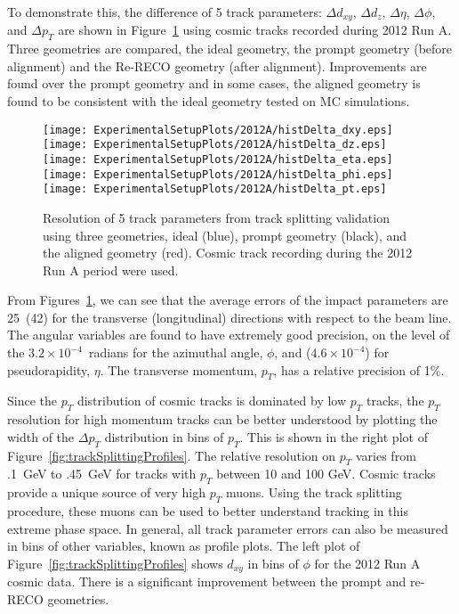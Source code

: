 To demonstrate this, the
difference of 5 track parameters: $\Delta d_{xy}$, $\Delta d_z$, 
$\Delta \eta$, $\Delta\phi$, and $\Delta p_T$ are shown in 
Figure~\ref{fig:trackSplitting2012A} 
using cosmic tracks recorded during 2012 Run A.  Three geometries 
are compared, the ideal geometry, the 
prompt geometry (before alignment) and the Re-RECO geometry (after 
alignment).  Improvements are found over the prompt geometry and
in some cases, the aligned geometry is found to be consistent 
with the ideal geometry tested on MC simulations.  

\begin{figure}
\begin{center}
\texttt{[image: ExperimentalSetupPlots/2012A/histDelta\_dxy.eps]}
\texttt{[image: ExperimentalSetupPlots/2012A/histDelta\_dz.eps]}
\texttt{[image: ExperimentalSetupPlots/2012A/histDelta\_eta.eps]}
\texttt{[image: ExperimentalSetupPlots/2012A/histDelta\_phi.eps]}
\texttt{[image: ExperimentalSetupPlots/2012A/histDelta\_pt.eps]}
\caption{Resolution of 5 track parameters from track splitting 
validation using three geometries, ideal (blue), prompt geometry 
(black), and the aligned geometry (red).  Cosmic track recording 
during the 2012 Run A period were used.}
\label{fig:trackSplitting2012A}
\end{center}
\end{figure}

From Figures~\ref{fig:trackSplitting2012A}, we can see 
that the average errors of the impact parameters are 
25\microns~(42\microns) for the transverse (longitudinal) 
directions with respect to the beam line.  The angular variables 
are found to have extremely good precision, on the level of 
the $3.2\times10^{-4}$~radians for the azimuthal angle, $\phi$, 
and ($4.6\times10^{-4}$) for pseudorapidity, $\eta$.  The 
transverse momentum, $p_T$, has a relative precision of 1\%.  

Since the $p_T$ distribution of cosmic tracks is dominated by low 
$p_T$ tracks, the $p_T$ resolution for high momentum tracks can be
better understood by plotting the width of the $\Delta p_T$ 
distribution in bins of $p_T$.  This is shown in the right plot of 
Figure~\ref{fig:trackSplittingProfiles}.  The relative resolution 
on $p_T$ varies from .1~GeV to .45~GeV for tracks with $p_T$ 
between 10 and 100 GeV.  Cosmic tracks provide a unique source
of very high $p_T$ muons.  Using the track splitting procedure, 
these muons can be used to better understand tracking in this
extreme phase space.  
In general, all track parameter errors can also be measured in 
bins of other variables, known as profile plots.  The left 
plot of Figure~\ref{fig:trackSplittingProfiles} shows $d_{xy}$ in 
bins of $\phi$ for the 2012 Run A cosmic data.  There is a 
significant improvement between the prompt and re-RECO geometries.

